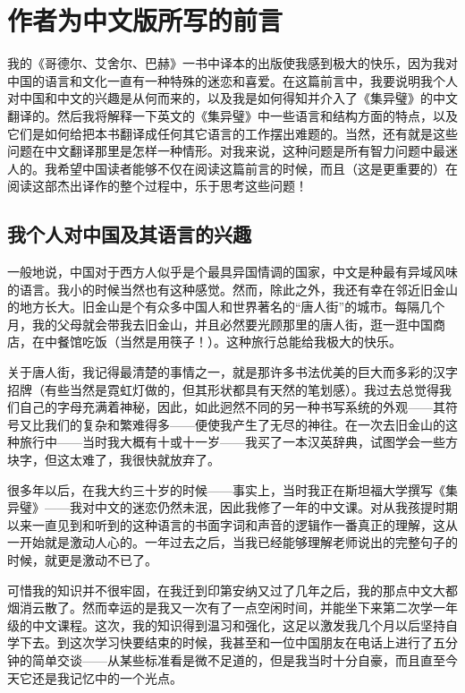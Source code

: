 
\chapter{作者为中文版所写的前言}

我的《哥德尔、艾舍尔、巴赫》一书中译本的出版使我感到极大的快乐，因为我对中国的语言和文化一直有一种特殊的迷恋和喜爱。在这篇前言中，我要说明我个人对中国和中文的兴趣是从何而来的，以及我是如何得知并介入了《集异璧》的中文翻译的。然后我将解释一下英文的《集异璧》中一些语言和结构方面的特点，以及它们是如何给把本书翻译成任何其它语言的工作摆出难题的。当然，还有就是这些问题在中文翻译那里是怎样一种情形。对我来说，这种问题是所有智力问题中最迷人的。我希望中国读者能够不仅在阅读这篇前言的时候，而且（这是更重要的）在阅读这部杰出译作的整个过程中，乐于思考这些问题！

\section{我个人对中国及其语言的兴趣}

一般地说，中国对于西方人似乎是个最具异国情调的国家，中文是种最有异域风味的语言。我小的时候当然也有这种感觉。然而，除此之外，我还有幸在邻近旧金山的地方长大。旧金山是个有众多中国人和世界著名的“唐人街”的城市。每隔几个月，我的父母就会带我去旧金山，并且必然要光顾那里的唐人街，逛一逛中国商店，在中餐馆吃饭（当然是用筷子！）。这种旅行总能给我极大的快乐。

关于唐人街，我记得最清楚的事情之一，就是那许多书法优美的巨大而多彩的汉字招牌（有些当然是霓虹灯做的，但其形状都具有天然的笔划感）。我过去总觉得我们自己的字母充满着神秘，因此，如此迥然不同的另一种书写系统的外观——其符号又比我们的复杂和繁难得多——便使我产生了无尽的神往。在一次去旧金山的这种旅行中——当时我大概有十或十一岁——我买了一本汉英辞典，试图学会一些方块字，但这太难了，我很快就放弃了。

很多年以后，在我大约三十岁的时候——事实上，当时我正在斯坦福大学撰写《集异璧》——我对中文的迷恋仍然未泯，因此我修了一年的中文课。对从我孩提时期以来一直见到和听到的这种语言的书面字词和声音的逻辑作一番真正的理解，这从一开始就是激动人心的。一年过去之后，当我已经能够理解老师说出的完整句子的时候，就更是激动不已了。

可惜我的知识并不很牢固，在我迁到印第安纳又过了几年之后，我的那点中文大都烟消云散了。然而幸运的是我又一次有了一点空闲时间，并能坐下来第二次学一年级的中文课程。这次，我的知识得到温习和强化，这足以激发我几个月以后坚持自学下去。到这次学习快要结束的时候，我甚至和一位中国朋友在电话上进行了五分钟的简单交谈——从某些标准看是微不足道的，但是我当时十分自豪，而且直至今天它还是我记忆中的一个光点。

